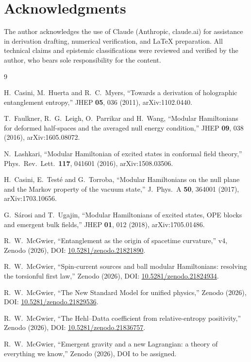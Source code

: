 \documentclass[11pt]{article}
\theoremstyle{definition}
\begin{document}
\section*{Acknowledgments}
The author acknowledges the use of Claude (Anthropic, claude.ai) for
assistance in derivation drafting, numerical verification, and \LaTeX{}
preparation. All technical claims and epistemic classifications were
reviewed and verified by the author, who bears sole responsibility for
the content.

\begin{thebibliography}{9}\small

H.~Casini, M.~Huerta and R.~C.~Myers, ``Towards a derivation of
holographic entanglement entropy,'' JHEP \textbf{05}, 036 (2011),
arXiv:1102.0440.

T.~Faulkner, R.~G.~Leigh, O.~Parrikar and H.~Wang, ``Modular Hamiltonians
for deformed half-spaces and the averaged null energy condition,''
JHEP \textbf{09}, 038 (2016), arXiv:1605.08072.

N.~Lashkari, ``Modular Hamiltonian of excited states in conformal field
theory,'' Phys.\ Rev.\ Lett.\ \textbf{117}, 041601 (2016),
arXiv:1508.03506.

H.~Casini, E.~Test\'e and G.~Torroba, ``Modular Hamiltonians on the null
plane and the Markov property of the vacuum state,''
J.\ Phys.\ A \textbf{50}, 364001 (2017), arXiv:1703.10656.

G.~S\'arosi and T.~Ugajin, ``Modular Hamiltonians of excited states, OPE
blocks and emergent bulk fields,'' JHEP \textbf{01}, 012 (2018),
arXiv:1705.01486.

R.~W.~McGwier, ``Entanglement as the origin of spacetime curvature,''
v4, Zenodo (2026), DOI:
\href{https://doi.org/10.5281/zenodo.21821890}{10.5281/zenodo.21821890}.

R.~W.~McGwier, ``Spin-current sources and ball modular Hamiltonians:
resolving the torsionful first law,'' Zenodo (2026), DOI:
\href{https://doi.org/10.5281/zenodo.21824934}{10.5281/zenodo.21824934}.

R.~W.~McGwier, ``The New Standard Model for unified physics,''
Zenodo (2026), DOI:
\href{https://doi.org/10.5281/zenodo.21829536}{10.5281/zenodo.21829536}.

R.~W.~McGwier, ``The Hehl--Datta coefficient from relative-entropy positivity,''
Zenodo (2026), DOI:
\href{https://doi.org/10.5281/zenodo.21836757}{10.5281/zenodo.21836757}.

R.~W.~McGwier, ``Emergent gravity and a new Lagrangian: a theory of everything we know,''
Zenodo (2026), DOI to be assigned.

\end{thebibliography}
\end{document}
